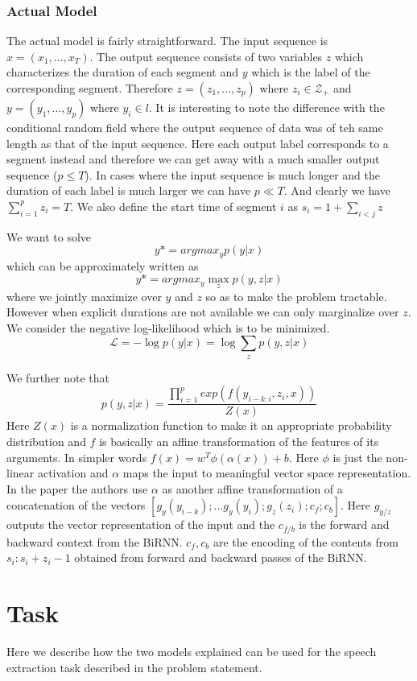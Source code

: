 \documentclass[letterpaper]{article} %
\begin{document}
\subsubsection{Actual Model} The actual model is fairly straightforward. The input sequence is $x = (x_1, ..., x_T)$. The output sequence consists of two variables $z$ which characterizes the duration of each segment and $y$ which is the label of the corresponding segment. Therefore $z = (z_1, ... , z_p)$ where $z_i \in \mathcal{Z_{+}}$ and $y = (y_1, ... , y_p)$ where $y_i \in l$. It is interesting to note the difference with the conditional random field where the output sequence of data was of teh same length as that of the input sequence. Here each output label corresponds to a segment instead and therefore we can get away with a much smaller output sequence ($p \le T$). In cases where the input sequence is much longer and the duration of each label is much larger we can have $p \ll T$. And clearly we have $ \sum_{i=1}^p z_i = T$. We also define the start time of segment $i$ as $s_i = 1 + \sum_{i < j}z$

We want to solve $$y* = argmax_y p(y | x)$$ which can be approximately written as $$y* = argmax_y \max_z p(y, z | x)$$ where we jointly maximize over $y$ and $z$ so as to make the problem tractable. However when explicit durations are not available we can only marginalize over $z$. We consider the negative log-likelihood which is to be minimized. $$\mathcal{L} = - \log p(y|x) = \log \sum_z p(y, z|x)$$

We further note that $$p(y, z |x) = \frac{\prod_{i=1}^p exp(f(y_{i-k:i}, z_i, x))}{Z(x)}$$ Here $Z(x)$ is a normalization function to make it an appropriate probability distribution and $f$ is basically an affine transformation of the features of its arguments. In simpler words $f(x) = w^T \phi(\alpha(x)) + b$. Here $\phi$ is just the non-linear activation and $\alpha$ maps the input to meaningful vector space representation. In the paper the authors use $\alpha$ as another affine transformation of a concatenation of the vectors $[g_y(y_{i-k});...g_y(y_i); g_z(z_i); c_f; c_b]$. Here $g_{y/z}$ outputs the vector representation of the input and the $c_{f/b}$ is the forward and backward context from the BiRNN. $c_f, c_b$ are the encoding of the contents from $s_i: s_i+z_i - 1$ obtained from forward and backward passes of the BiRNN.


\section{Task}
Here we describe how the two models explained can be used for the speech extraction task described in the problem statement.
\end{document}
